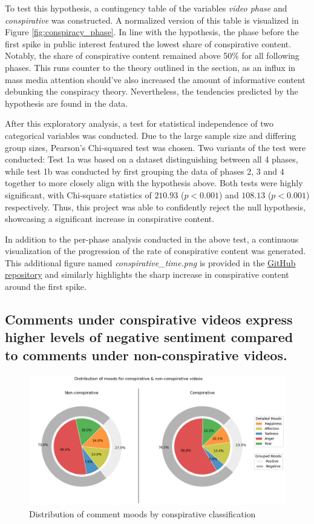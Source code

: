 \documentclass[fontsize=11pt, parskip=half]{scrartcl}
\begin{document}
    To test this hypothesis, a contingency table of the variables \textit{video phase} and \textit{conspirative} was constructed. A normalized version of this table is visualized in Figure \ref{fig:conspiracy_phase}. In line with the hypothesis, the phase before the first spike in public interest featured the lowest share of conspirative content. Notably, the share of conspirative content remained above 50\% for all following phases. This runs counter to the theory outlined in the  section, as an influx in mass media attention should've also increased the amount of informative content debunking the conspiracy theory. Nevertheless, the tendencies predicted by the hypothesis are found in the data.
    
    After this exploratory analysis, a test for statistical independence of two categorical variables was conducted. Due to the large sample size and differing group sizes, Pearson's Chi-squared test was chosen. Two variants of the test were conducted: Test 1a was based on a dataset distinguishing between all 4 phases, while test 1b was conducted by first grouping the data of phases 2, 3 and 4 together to more closely align with the hypothesis above. Both tests were highly significant, with Chi-square statistics of $210.93$ ($p < 0.001$) and $108.13$ ($p < 0.001$) respectively. Thus, this project was able to confidently reject the null hypothesis, showcasing a significant increase in conspirative content.    

    In addition to the per-phase analysis conducted in the above test, a continuous visualization of the progression of the rate of conspirative content was generated. This additional figure named \textit{conspirative\_time.png} is provided in the \href{https://github.com/julia-king-edu/so-24_smda_project}{GitHub repository} and similarly highlights the sharp increase in conspirative content around the first spike. 

    \subsection{Comments under conspirative videos express higher levels of negative sentiment compared to comments under non-conspirative videos.}

    \begin{figure}
        \centering
        \vspace{-20pt}
        \setlength\intextsep{0pt}
        \includegraphics[width=0.58 \textwidth]{img/moods_conspirative-pie.png}
        \vspace{-5pt}
        \caption{Distribution of comment moods by conspirative classification}
        \vspace{-10pt}
        \label{fig:moods_conspirative-pie}
    \end{figure}
\end{document}
